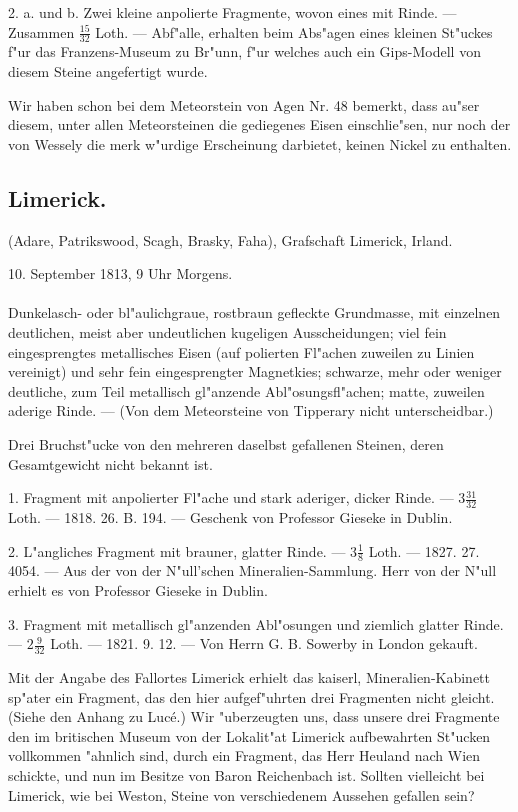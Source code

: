 \documentclass[a4paper, 11pt, oneside, polutonikogreek, german]{article}
\begin{document}
2. a. und b. Zwei kleine anpolierte Fragmente, wovon eines mit Rinde. --- Zusammen $\frac{15}{32}$ Loth. --- Abf"alle, erhalten beim Abs"agen eines kleinen St"uckes f"ur das Franzens-Museum zu Br"unn, f"ur welches auch ein Gips-Modell von diesem Steine angefertigt wurde.

Wir haben schon bei dem Meteorstein von Agen Nr. 48 bemerkt, dass au"ser diesem, unter allen Meteorsteinen die gediegenes Eisen einschlie"sen, nur noch der von Wessely die merk w"urdige Erscheinung darbietet, keinen Nickel zu enthalten.
\subsection{Limerick.}
\begin{center}
\small
(Adare, Patrikswood, Scagh, Brasky, Faha), Grafschaft Limerick, Irland.

10. September 1813, 9 Uhr Morgens.
\end{center}
\paragraph{}
Dunkelasch- oder bl"aulichgraue, rostbraun gefleckte Grundmasse, mit einzelnen deutlichen, meist aber undeutlichen kugeligen Ausscheidungen; viel fein eingesprengtes metallisches Eisen (auf polierten Fl"achen zuweilen zu Linien vereinigt) und sehr fein eingesprengter Magnetkies; schwarze, mehr oder weniger deutliche, zum Teil metallisch gl"anzende Abl"osungsfl"achen; matte, zuweilen aderige Rinde. --- (Von dem Meteorsteine von Tipperary nicht unterscheidbar.)

Drei Bruchst"ucke von den mehreren daselbst gefallenen Steinen, deren Gesamtgewicht nicht bekannt ist.

1. Fragment mit anpolierter Fl"ache und stark aderiger, dicker Rinde. --- $3\frac{31}{32}$ Loth. --- 1818. 26. B. 194. --- Geschenk von Professor Gieseke in Dublin.

2. L"angliches Fragment mit brauner, glatter Rinde. --- $3\frac{1}{8}$ Loth. --- 1827. 27. 4054. --- Aus der von der N"ull'schen Mineralien-Sammlung. Herr von der N"ull erhielt es von Professor Gieseke in Dublin.

3. Fragment mit metallisch gl"anzenden Abl"osungen und ziemlich glatter Rinde. --- $2\frac{9}{32}$ Loth. --- 1821. 9. 12. --- Von Herrn G. B. Sowerby in London gekauft.

Mit der Angabe des Fallortes Limerick erhielt das kaiserl, Mineralien-Kabinett sp"ater ein Fragment, das den hier aufgef"uhrten drei Fragmenten nicht gleicht. (Siehe den Anhang zu Lucé.) Wir "uberzeugten uns, dass unsere drei Fragmente den im britischen Museum von der Lokalit"at Limerick aufbewahrten St"ucken vollkommen "ahnlich sind, durch ein Fragment, das Herr Heuland nach Wien schickte, und nun im Besitze von Baron Reichenbach ist. Sollten vielleicht bei Limerick, wie bei Weston, Steine von verschiedenem Aussehen gefallen sein?
\end{document}
